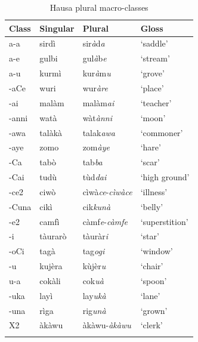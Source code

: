 \begin{table}
  \centering
  \begin{tabular}{llll}
    \lsptoprule
    Class & Singular & Plural                          & Gloss          \\
    \midrule
    a-a   & sirdì    & sir\textit{à}d\textit{a}        & `saddle'       \\
    a-e   & gulbi    & gul\textit{à}b\textit{e}        & `stream'       \\
    a-u   & kurmì    & kur\textit{à}m\textit{u}        & `grove'        \\
    -aCe  & wuri     & wur\textit{àre}                 & `place'        \\
    -ai   & malàm    & malàm\textit{ai}                & `teacher'      \\
    -anni & watà     & wàt\textit{ànni}                & `moon'         \\
    -awa  & talàkà   & talak\textit{awa}               & `commoner'     \\
    -aye  & zomo     & zom\textit{àye}                 & `hare'         \\
    -Ca   & tabò     & tab\textit{ba}                  & `scar'         \\
    -Cai  & tudù     & tùd\textit{dai}                 & `high ground'  \\
    -ce2  & ciwò     & cìwà\textit{ce}-\textit{cìwàce} & `illness'      \\
    -Cuna & cikì     & cik\textit{kunà}                & `belly'        \\
    -e2   & camfì    & càmf\textit{e}-\textit{càmfe}   & `superstition' \\
    -i    & tàurarò  & tàuràr\textit{i}                & `star'         \\
    -oCi  & tagà     & tag\textit{ogi}                 & `window'       \\
    -u    & kujèra   & kùjèr\textit{u}                 & `chair'        \\
    u-a   & cokàli   & cok\textit{uà}                  & `spoon'        \\
    -uka  & layì     & lay\textit{ukà}                 & `lane'         \\
    -una  & rìga     & rig\textit{unà}                 & `grown'        \\
    X2    & àkàwu    & àkàwu-\textit{àkàwu}            & `clerk'        \\
    \lspbottomrule
  \end{tabular}
  \caption{Hausa plural macro-classes} \label{tab:macro-hausa}
\end{table}

